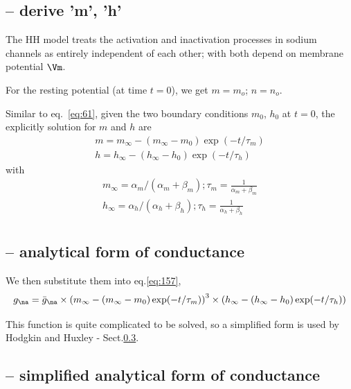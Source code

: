\subsection{-- derive 'm', 'h'}

The HH model treats the activation and inactivation processes in sodium
channels as entirely independent of each other; with both depend on membrane
potential $\Vm$.

For the resting potential (at time $t=0$), we get $m=m_o$; $n=n_o$.

Similar to eq.~\eqref{eq:61}, given the two
boundary conditions $m_0$, $h_0$ at $t=0$, the explicitly solution for
$m$ and $h$ are
\begin{equation}
  \label{eq:66}
  \begin{split}
    m = m_\infty - (m_\infty - m_0) \exp (-t/\tau_m) \\
    h = h_\infty - (h_\infty - h_0) \exp (-t/\tau_h) 
  \end{split}
\end{equation}
with
\begin{equation}
  \label{eq:67}
  \begin{split}
      m_\infty = \alpha_m /(\alpha_m + \beta_m); \tau_m =
  \frac{1}{\alpha_m+\beta_m} \\
  h_\infty = \alpha_h /(\alpha_h + \beta_h); \tau_h =
  \frac{1}{\alpha_h+\beta_h} \\
  \end{split}
\end{equation}

\subsection{-- analytical form of conductance}
\label{sec:conductance-Na+-current-HH-analytical-form}

We then substitute them into eq.\ref{eq:157}, 
\begin{equation}
\label{eq:HH-Na-conductance-exact-form}
g_\na = \bar{g}_{\na} \times \left( m_\infty - (m_\infty - m_0) \exp
(-t/\tau_m) \right)^3 \times \left( h_\infty - (h_\infty - h_0) \exp
(-t/\tau_h)\right)
\end{equation}

This function is quite complicated to be solved, so a simplified form is used by
Hodgkin and Huxley -
Sect.\ref{sec:conductance-Na+-current-HH-analytical-form-simplified-formed}.

\subsection{-- simplified analytical form of conductance}
\label{sec:conductance-Na+-current-HH-analytical-form-simplified-formed}

